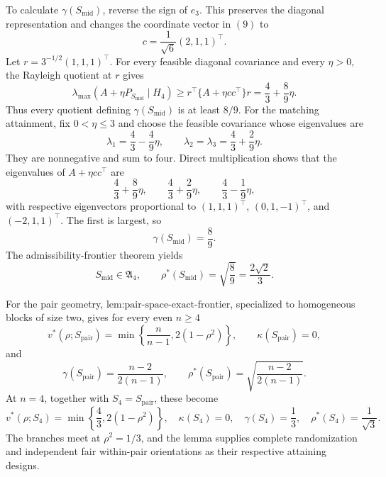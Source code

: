 To calculate \(\gamma(S_{\mathrm{mid}})\), reverse the sign of \(e_3\).  This preserves the diagonal representation and changes the coordinate vector in \((9)\) to
\[
c=\frac1{\sqrt6}(2,1,1)^\top.
\tag{11}
\]
Let \(r=3^{-1/2}(1,1,1)^\top\).  For every feasible diagonal covariance and every \(\eta>0\), the Rayleigh quotient at \(r\) gives
\[
\lambda_{\max}(A+\eta P_{S_{\mathrm{mid}}}\mid H_4)
\geq r^\top\{A+\eta cc^\top\}r
=\frac43+\frac89\eta.
\tag{12}
\]
Thus every quotient defining \(\gamma(S_{\mathrm{mid}})\) is at least \(8/9\).  For the matching attainment, fix \(0<\eta\leq3\) and choose the feasible covariance whose eigenvalues are
\[
\lambda_1=\frac43-\frac49\eta,
\qquad
\lambda_2=\lambda_3=\frac43+\frac29\eta.
\tag{13}
\]
They are nonnegative and sum to four.  Direct multiplication shows that the eigenvalues of \(A+\eta cc^\top\) are
\[
\frac43+\frac89\eta,
\qquad
\frac43+\frac29\eta,
\qquad
\frac43-\frac19\eta,
\tag{14}
\]
with respective eigenvectors proportional to \((1,1,1)^\top\), \((0,1,-1)^\top\), and \((-2,1,1)^\top\).  The first is largest, so
\[
\gamma(S_{\mathrm{mid}})=\frac89.
\tag{15}
\]
The admissibility-frontier theorem yields
\[
S_{\mathrm{mid}}\in\mathfrak A_4,
\qquad
\rho^*(S_{\mathrm{mid}})=\sqrt{\frac89}=\frac{2\sqrt2}{3}.
\tag{16}
\]

For the pair geometry, \(\text{lem:pair-space-exact-frontier}\), specialized to homogeneous blocks of size two, gives for every even \(n\geq4\)
\[
v^*(\rho;S_{\mathrm{pair}})
=\min\left\{\frac{n}{n-1},2(1-\rho^2)\right\},
\qquad
\kappa(S_{\mathrm{pair}})=0,
\tag{17}
\]
and
\[
\gamma(S_{\mathrm{pair}})=\frac{n-2}{2(n-1)},
\qquad
\rho^*(S_{\mathrm{pair}})=\sqrt{\frac{n-2}{2(n-1)}}.
\tag{18}
\]
At \(n=4\), together with \(S_4=S_{\mathrm{pair}}\), these become
\[
v^*(\rho;S_4)=\min\left\{\frac43,2(1-\rho^2)\right\},
\quad
\kappa(S_4)=0,
\quad
\gamma(S_4)=\frac13,
\quad
\rho^*(S_4)=\frac1{\sqrt3}.
\tag{19}
\]
The branches meet at \(\rho^2=1/3\), and the lemma supplies complete randomization and independent fair within-pair orientations as their respective attaining designs.

